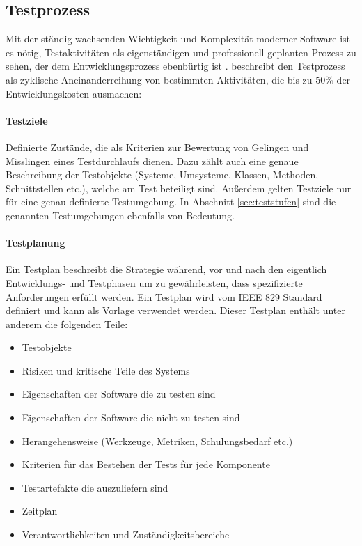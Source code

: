\subsection{Testprozess}
Mit der ständig wachsenden Wichtigkeit und Komplexität moderner Software ist es nötig, Testaktivitäten als eigenständigen und professionell geplanten Prozess zu sehen, der dem Entwicklungsprozess ebenbürtig ist \cite{grechenig_softwaretechnik:_2010}. \citeauthor{grechenig_softwaretechnik:_2010} beschreibt den Testprozess als zyklische Aneinanderreihung von bestimmten Aktivitäten, die bis zu 50\% der Entwicklungskosten ausmachen:

\paragraph{Testziele} Definierte Zustände, die als Kriterien zur Bewertung von Gelingen und Misslingen eines Testdurchlaufs dienen. Dazu zählt auch eine genaue Beschreibung der Testobjekte (Systeme, Umsysteme, Klassen, Methoden, Schnittstellen etc.), welche am Test beteiligt sind. Außerdem gelten Testziele nur für eine genau definierte Testumgebung. In Abschnitt \ref{sec:teststufen}  sind die genannten Testumgebungen ebenfalls von Bedeutung.

\paragraph{Testplanung} Ein Testplan beschreibt die Strategie während, vor und nach den eigentlich Entwicklungs- und Testphasen um zu gewährleisten, dass spezifizierte Anforderungen erfüllt werden. Ein Testplan wird vom IEEE 829 \cite{_ieee_2008} Standard definiert und kann als Vorlage verwendet werden. Dieser Testplan enthält unter anderem die folgenden Teile:

\begin{itemize}
\item Testobjekte
\item Risiken und kritische Teile des Systems
\item Eigenschaften der Software die zu testen sind
\item Eigenschaften der Software die nicht zu testen sind
\item Herangehensweise (Werkzeuge, Metriken, Schulungsbedarf etc.)
\item Kriterien für das Bestehen der Tests für jede Komponente
\item Testartefakte die auszuliefern sind
\item Zeitplan
\item Verantwortlichkeiten und Zuständigkeitsbereiche
\end{itemize}

